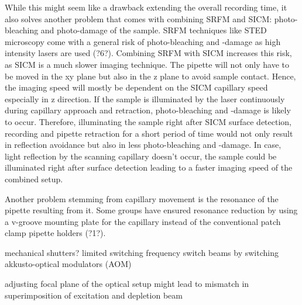 While this might seem like a drawback extending the overall recording time, it
also solves another problem that comes with combining SRFM and SICM:
photo-bleaching and photo-damage of the sample. SRFM techniques like STED
microscopy come with a general risk of photo-bleaching and -damage as high
intensity lasers are used (?6?). Combining SRFM with SICM increases this risk,
as SICM is a much slower imaging technique. The pipette will not only have to
be moved in the xy plane but also in the z plane to avoid sample
contact. Hence, the imaging speed will mostly be dependent on the SICM
capillary speed especially in z direction. If the sample is illuminated by the
laser continuously during capillary approach and retraction, photo-bleaching
and -damage is likely to occur. Therefore, illuminating the sample right after
SICM surface detection, recording and pipette retraction for a short period of
time would not only result in reflection avoidance but also in less
photo-bleaching and -damage. In case, light reflection by the scanning
capillary doesn't occur, the sample could be illuminated right after surface
detection leading to a faster imaging speed of the combined setup.

Another problem stemming from capillary movement is the resonance of the
pipette resulting from it. Some groups have ensured resonance reduction by
using a v-groove mounting plate for the capillary instead of the conventional
patch clamp pipette holders (?1?).

 	
mechanical shutters? limited switching frequency switch beams by switching
akkusto-optical modulators (AOM)

adjusting focal plane of the optical setup might lead to mismatch in
superimposition of excitation and depletion beam


